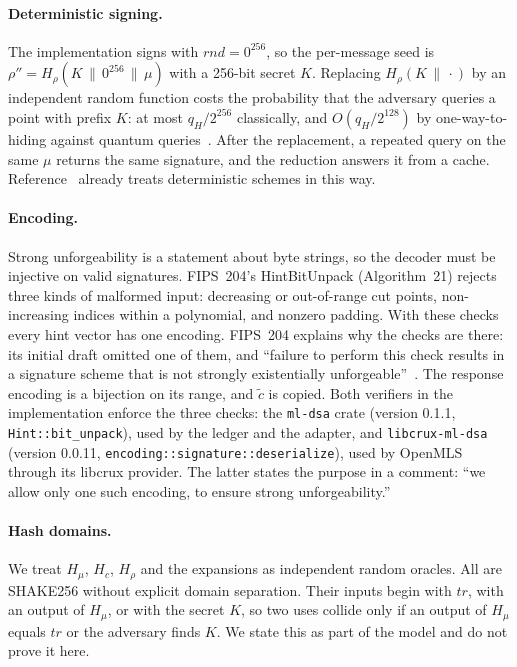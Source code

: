 \documentclass[aps,prx,reprint,superscriptaddress,nofootinbib,floatfix]{revtex4-2}
\theoremstyle{remark}
\newcommand{\Hc}{H_{c}}
\newcommand{\Hm}{H_{\mu}}
\newcommand{\Hr}{H_{\rho}}
\begin{document}
\paragraph*{Deterministic signing.} The implementation signs with $\mathit{rnd}=0^{256}$, so the per-message seed is $\rho''=\Hr(K\,\|\,0^{256}\,\|\,\mu)$ with a 256-bit secret $K$. Replacing $\Hr(K\,\|\,\cdot)$ by an independent random function costs the probability that the adversary queries a point with prefix $K$: at most $q_H/2^{256}$ classically, and $O(q_H/2^{128})$ by one-way-to-hiding against quantum queries~\cite{o2h}. After the replacement, a repeated query on the same $\mu$ returns the same signature, and the reduction answers it from a cache. Reference~\cite{kls18} already treats deterministic schemes in this way.

\paragraph*{Encoding.} Strong unforgeability is a statement about byte strings, so the decoder must be injective on valid signatures. FIPS~204's HintBitUnpack (Algorithm~21) rejects three kinds of malformed input: decreasing or out-of-range cut points, non-increasing indices within a polynomial, and nonzero padding. With these checks every hint vector has one encoding. FIPS~204 explains why the checks are there: its initial draft omitted one of them, and ``failure to perform this check results in a signature scheme that is not strongly existentially unforgeable''~\cite[App.~D.2]{fips204}. The response encoding is a bijection on its range, and $\tilde c$ is copied. Both verifiers in the implementation enforce the three checks: the \texttt{ml-dsa} crate (version 0.1.1, \texttt{Hint::bit\_unpack}), used by the ledger and the adapter, and \texttt{libcrux-ml-dsa} (version 0.0.11, \texttt{encoding::signature::deserialize}), used by OpenMLS through its libcrux provider. The latter states the purpose in a comment: ``we allow only one such encoding, to ensure strong unforgeability.''

\paragraph*{Hash domains.} We treat $\Hm$, $\Hc$, $\Hr$ and the expansions as independent random oracles. All are SHAKE256 without explicit domain separation. Their inputs begin with $\mathit{tr}$, with an output of $\Hm$, or with the secret $K$, so two uses collide only if an output of $\Hm$ equals $\mathit{tr}$ or the adversary finds $K$. We state this as part of the model and do not prove it here.
\end{document}
